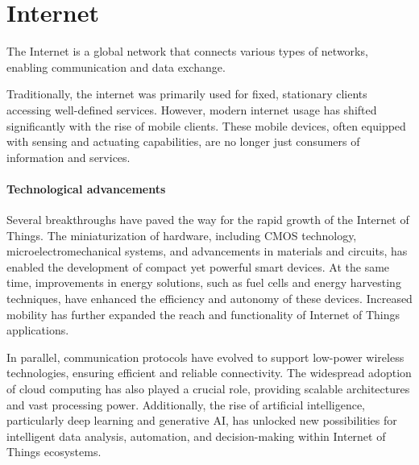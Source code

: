 \section{Internet}

\begin{definition}
    The Internet is a global network that connects various types of networks, enabling communication and data exchange.
\end{definition}
Traditionally, the internet was primarily used for fixed, stationary clients accessing well-defined services. 
However, modern internet usage has shifted significantly with the rise of mobile clients. 
These mobile devices, often equipped with sensing and actuating capabilities, are no longer just consumers of information and services.

\paragraph*{Technological advancements}
Several breakthroughs have paved the way for the rapid growth of the Internet of Things. 
The miniaturization of hardware, including CMOS technology, microelectromechanical systems, and advancements in materials and circuits, has enabled the development of compact yet powerful smart devices. 
At the same time, improvements in energy solutions, such as fuel cells and energy harvesting techniques, have enhanced the efficiency and autonomy of these devices. 
Increased mobility has further expanded the reach and functionality of Internet of Things applications.

In parallel, communication protocols have evolved to support low-power wireless technologies, ensuring efficient and reliable connectivity. 
The widespread adoption of cloud computing has also played a crucial role, providing scalable architectures and vast processing power. 
Additionally, the rise of artificial intelligence, particularly deep learning and generative AI, has unlocked new possibilities for intelligent data analysis, automation, and decision-making within Internet of Things ecosystems.

